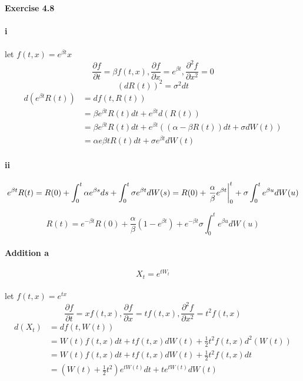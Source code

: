 \documentclass{article}
\begin{document}
\paragraph{Exercise 4.8 }
\paragraph{i}
\paragraph{}{let $f(t,x)=e^{\beta t}x$}
\begin{displaymath}
 \frac{\partial f}{\partial t}=\beta f(t,x),\frac{\partial f}{\partial x}=e^{\beta t},\frac{\partial^2 f}{\partial x^2}=0
\end{displaymath}
\begin{displaymath}
  (dR(t))^2=\sigma^2 dt
\end{displaymath}
\begin{align*}
  d(e^{\beta t}R(t)) & =df(t,R(t)) \\
   &=\beta e^{\beta t} R(t)dt+e^{\beta t}d(R(t)) \\
  & =\beta e^{\beta t}R(t)dt+e^{\beta t}((\alpha-\beta R(t))dt+\sigma dW(t)) \\
   & =\alpha e{\beta t}R(t)dt+\sigma e^{\beta t}d W(t)
\end{align*}
\paragraph{ii}
\newcommand\rsx[1]{\left.{#1}\vphantom{\Big|}\right|}
\begin{displaymath}
  e^{\beta t}R(t)  =R(0)+\int_{0}^{t}\alpha e^{\beta s}ds+\int_{0}^{t}\sigma e^{\beta t}dW(s)
  =R(0)+\rsx{\frac{\alpha}{\beta}e^{\beta t}}_{0}^{t}+\sigma\int_{0}^{t}e^{\beta u}dW(u)
\end{displaymath}

\begin{displaymath}
R(t)=e^{-\beta t}R(0)+\frac{\alpha}{\beta}(1-e^{\beta t})+e^{-\beta t}\sigma\int_{0}^{t}e^{\beta u}dW(u)
\end{displaymath}
\paragraph{Addition a}
\begin{displaymath}
  X_t=e^{tW_t}
\end{displaymath}
\paragraph{}{let $f(t,x)=e^{tx}$}
\begin{displaymath}
 \frac{\partial f}{\partial t}=xf(t,x),\frac{\partial f}{\partial x}=tf(t,x),\frac{\partial^2 f}{\partial x^2}=t^2f(t,x)
\end{displaymath}
\begin{align*}
  d(X_t) & =df(t,W(t)) \\
   &=W(t)f(t,x)dt+tf(t,x)dW(t)+\frac{1}{2}t^2f(t,x)d^2(W(t)) \\
   &=W(t)f(t,x)dt+tf(t,x)dW(t)+\frac{1}{2}t^2f(t,x)dt\\
   &=(W(t)+\frac{1}{2}t^2)e^{tW(t)}dt+te^{tW(t)}dW(t)
\end{align*}
\end{document}
